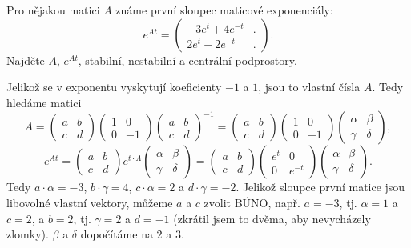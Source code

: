 \documentclass[12pt]{article}					%
\begin{document}
\begin{priklad}
	Pro nějakou matici $A$ známe první sloupec maticové exponenciály:
	$$ e^{A t} = \begin{pmatrix} -3e^t + 4e^{-t} & . \\ 2e^t - 2e^{-t} & . \end{pmatrix}. $$
	Najděte $A$, $e^{A t}$, stabilní, nestabilní a centrální podprostory.

	\begin{reseni}
		Jelikož se v exponentu vyskytují koeficienty $-1$ a $1$, jsou to vlastní čísla $A$. Tedy hledáme matici
		$$ A = \begin{pmatrix} a & b \\ c & d \end{pmatrix} \begin{pmatrix} 1 & 0 \\ 0 & -1 \end{pmatrix} \begin{pmatrix} a & b \\ c & d \end{pmatrix}^{-1} = \begin{pmatrix} a & b \\ c & d \end{pmatrix} \begin{pmatrix} 1 & 0 \\ 0 & -1 \end{pmatrix} \begin{pmatrix} \alpha & \beta \\ \gamma & \delta \end{pmatrix}, $$
		$$ e^{A t} = \begin{pmatrix} a & b \\ c & d \end{pmatrix} e^{t· \Lambda} \begin{pmatrix} \alpha & \beta \\ \gamma & \delta \end{pmatrix} = \begin{pmatrix} a & b \\ c & d \end{pmatrix} \begin{pmatrix} e^t & 0 \\ 0 & e^{-t} \end{pmatrix} \begin{pmatrix} \alpha & \beta \\ \gamma & \delta \end{pmatrix}. $$
		Tedy $a·\alpha = -3$, $b·\gamma = 4$, $c·\alpha = 2$ a $d·\gamma = -2$. Jelikož sloupce první matice jsou libovolné vlastní vektory, můžeme $a$ a $c$ zvolit BÚNO, např. $a = -3$, tj. $\alpha = 1$ a $c = 2$, a $b = 2$, tj. $\gamma = 2$ a $d = -1$ (zkrátil jsem to dvěma, aby nevycházely zlomky). $\beta$ a $\delta$ dopočítáme na $2$ a $3$.


\end{reseni}
\end{priklad}
\end{document}
